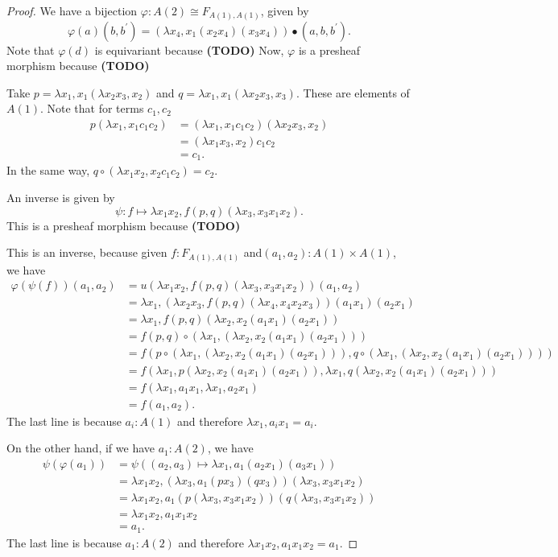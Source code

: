 \documentclass[a4paper]{amsbook}
\theoremstyle{definition}
\theoremstyle{remark}
\newcommand\TODO{\textbf{(TODO)} }
\begin{document}
  \begin{proof}
    We have a bijection $ \varphi: A(2) \cong F_{A(1), A(1)} $, given by
    \[ \varphi(a)(b, b^\prime) = (\lambda x_4, x_1 (x_2 x_4) (x_3 x_4)) \bullet (a, b, b^\prime). \]
    Note that $ \varphi(d) $ is equivariant because \TODO
    Now, $ \varphi $ is a presheaf morphism because \TODO

    Take $ p = \lambda x_1, x_1 (\lambda x_2 x_3, x_2) $ and $ q = \lambda x_1, x_1 (\lambda x_2 x_3, x_3) $. These are elements of $ A(1) $. Note that for terms $ c_1, c_2 $
    \begin{align*}
      p (\lambda x_1, x_1 c_1 c_2)
      &= (\lambda x_1, x_1 c_1 c_2) (\lambda x_2 x_3, x_2)\\
      &= (\lambda x_1 x_3, x_2) c_1 c_2\\
      &= c_1.
    \end{align*}
    In the same way, $ q \circ (\lambda x_1 x_2, x_2 c_1 c_2) = c_2 $.

    An inverse is given by
    \[ \psi: f \mapsto \lambda x_1 x_2, f(p, q)(\lambda x_3, x_3 x_1 x_2). \]
    This is a presheaf morphism because \TODO

    This is an inverse, because given $ f: F_{A(1), A(1)} $ and$ (a_1, a_2): A(1) \times A(1) $, we have
    \begin{align*}
      \varphi(\psi(f))(a_1, a_2) &= u(\lambda x_1 x_2, f(p, q)(\lambda x_3, x_3 x_1 x_2))(a_1, a_2)\\
      &= \lambda x_1, (\lambda x_2 x_3, f(p, q)(\lambda x_4, x_4 x_2 x_3)) (a_1 x_1) (a_2 x_1)\\
      &= \lambda x_1, f(p, q)(\lambda x_2, x_2 (a_1 x_1) (a_2 x_1))\\
      &= f(p, q) \circ (\lambda x_1, (\lambda x_2, x_2 (a_1 x_1) (a_2 x_1)))\\
      &= f(p \circ (\lambda x_1, (\lambda x_2, x_2 (a_1 x_1) (a_2 x_1))), q \circ (\lambda x_1, (\lambda x_2, x_2 (a_1 x_1) (a_2 x_1))))\\
      &= f(\lambda x_1, p (\lambda x_2, x_2 (a_1 x_1) (a_2 x_1)), \lambda x_1, q (\lambda x_2, x_2 (a_1 x_1) (a_2 x_1)))\\
      &= f(\lambda x_1, a_1 x_1, \lambda x_1, a_2 x_1)\\
      &= f(a_1, a_2).
    \end{align*}
    The last line is because $ a_i : A(1) $ and therefore $ \lambda x_1, a_i x_1 = a_i $.

    On the other hand, if we have $ a_1: A(2) $, we have
    \begin{align*}
      \psi(\varphi(a_1)) &= \psi((a_2, a_3) \mapsto \lambda x_1, a_1 (a_2 x_1) (a_3 x_1))\\
      &= \lambda x_1 x_2, (\lambda x_3, a_1 (p x_3) (q x_3)) (\lambda x_3, x_3 x_1 x_2)\\
      &= \lambda x_1 x_2, a_1 (p (\lambda x_3, x_3 x_1 x_2)) (q (\lambda x_3, x_3 x_1 x_2))\\
      &= \lambda x_1 x_2, a_1 x_1 x_2\\
      &= a_1.
    \end{align*}
    The last line is because $ a_1 : A(2) $ and therefore $ \lambda x_1 x_2, a_1 x_1 x_2 = a_1 $.


\end{proof}
\end{document}
